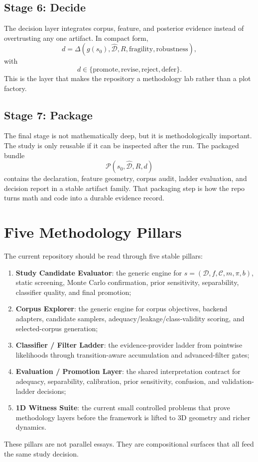 \documentclass[11pt]{article}
\begin{document}
\subsection{Stage 6: Decide}
The decision layer integrates corpus, feature, and posterior evidence instead
of overtrusting any one artifact. In compact form,
\begin{equation}
d
=
\Delta(
g(s_0),
\widehat{\mathcal{D}},
R,
\text{fragility},
\text{robustness}
),
\end{equation}
with
\begin{equation}
d \in \{\text{promote}, \text{revise}, \text{reject}, \text{defer}\}.
\end{equation}
This is the layer that makes the repository a methodology lab rather than a
plot factory.

\subsection{Stage 7: Package}
The final stage is not mathematically deep, but it is methodologically
important. The study is only reusable if it can be inspected after the run.
The packaged bundle
\begin{equation}
\mathcal{P}(s_0, \widehat{\mathcal{D}}, R, d)
\end{equation}
contains the declaration, feature geometry, corpus audit, ladder evaluation,
and decision report in a stable artifact family. That packaging step is how the
repo turns math and code into a durable evidence record.

\section{Five Methodology Pillars}
The current repository should be read through five stable pillars:
\begin{enumerate}[leftmargin=1.5em]
  \item \textbf{Study Candidate Evaluator}: the generic engine for \(s = (\mathcal{D}, f, \mathcal{C}, m, \pi, b)\), static screening, Monte Carlo confirmation, prior sensitivity, separability, classifier quality, and final promotion;
  \item \textbf{Corpus Explorer}: the generic engine for corpus objectives, backend adapters, candidate samplers, adequacy/leakage/class-validity scoring, and selected-corpus generation;
  \item \textbf{Classifier / Filter Ladder}: the evidence-provider ladder from pointwise likelihoods through transition-aware accumulation and advanced-filter gates;
  \item \textbf{Evaluation / Promotion Layer}: the shared interpretation contract for adequacy, separability, calibration, prior sensitivity, confusion, and validation-ladder decisions;
  \item \textbf{1D Witness Suite}: the current small controlled problems that prove methodology layers before the framework is lifted to 3D geometry and richer dynamics.
\end{enumerate}
These pillars are not parallel essays. They are compositional surfaces that all feed the same study decision.
\end{document}
